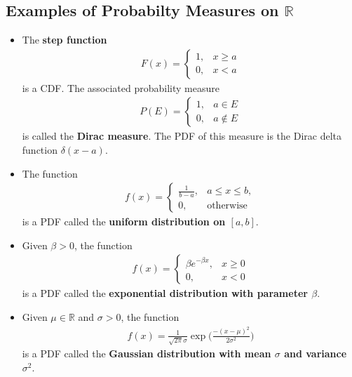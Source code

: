 \documentclass[10pt]{article}
\numberwithin{lemma}{section}
\newcommand{\Real}{\mathbb{R}}
\begin{document}
\subsection{Examples of Probabilty Measures on $\Real$}
\begin{itemize}
    
    \item The {\bf step function}
    \begin{align*}
      F(x) = \begin{cases}
        1, & x \geq a \\
        0, & x < a
      \end{cases}
    \end{align*}
    is a CDF. The associated probability measure
    \begin{align*}
      P(E) = \begin{cases}
        1, & a \in E \\
        0, & a \not\in E
      \end{cases}
    \end{align*}
    is called the {\bf Dirac measure}. The PDF of this measure is the Dirac delta function $\delta(x-a)$.

    \item The function
    \begin{align*}
      f(x) = \begin{cases}
        \frac{1}{b-a}, & a \leq x \leq b, \\
        0, & \mbox{otherwise}
      \end{cases}
    \end{align*} 
    is a PDF called the {\bf uniform distribution on $[a,b]$}.
    
    \item Given $\beta > 0$, the function
    \begin{align*}
      f(x) = \begin{cases}
        \beta e^{-\beta x}, & x \geq 0 \\
        0, & x < 0
      \end{cases}
    \end{align*}
    is a PDF called the {\bf exponential distribution with parameter $\beta$}.

    \item Given $\mu \in \Real$ and $\sigma > 0$, the function
    \begin{align*}
      f(x) = \frac{1}{\sqrt{2\pi}\sigma} \exp\bigg( \frac{-(x - \mu)^2}{2\sigma^2} \bigg)
    \end{align*}
    is a PDF called the {\bf Gaussian distribution with mean $\sigma$ and variance $\sigma^2$}.
\end{itemize}
\end{document}
